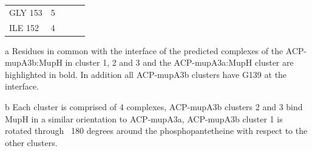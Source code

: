 \begin{table}
\begin{small}
\begin{center}
\begin{threeparttable}[b]
\begin{tabular}{p{2cm} p{2cm} p{3.25cm} p{3.25cm} p{3.25cm}}
			GLY 153 & 5 &  &  &  \\ 
			ILE 152 & 4 &  &  &  \\ 
			\bottomrule[2pt]
			\end{tabular}
			\begin{tablenotes}
			\item[a] Residues in common with the interface of the predicted complexes of the ACP-mupA3b:MupH in cluster 1, 2 and 3 and the ACP-mupA3a:MupH cluster are highlighted in bold. In addition all ACP-mupA3b clusters have G139 at the interface.
			\item[b] Each cluster is comprised of 4 complexes, ACP-mupA3b clusters 2 and 3 bind MupH in a similar orientation to ACP-mupA3a, ACP-mupA3b cluster 1 is rotated through ~180 degrees around the phosphopantetheine with respect to the other clusters.
			\end{tablenotes}
			\end{threeparttable}
			\end{center}
			\end{small}
		    \end{table}
    	
